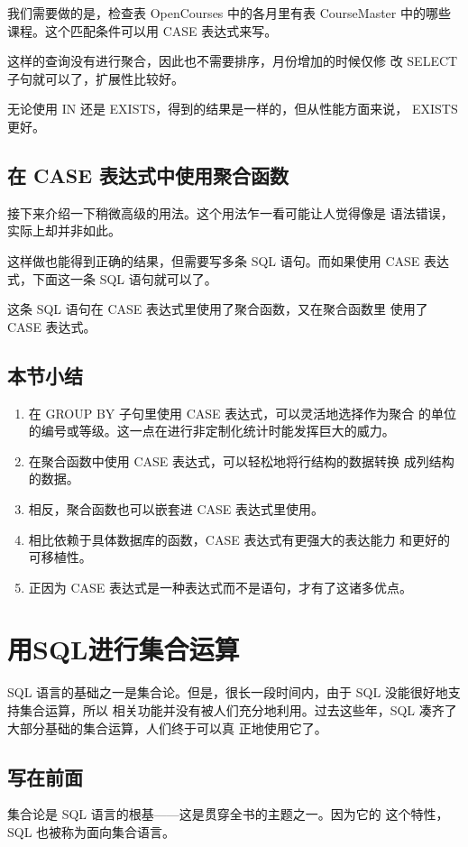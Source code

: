 我们需要做的是，检查表 OpenCourses 中的各月里有表 CourseMaster
中的哪些课程。这个匹配条件可以用 CASE 表达式来写。


这样的查询没有进行聚合，因此也不需要排序，月份增加的时候仅修
改 SELECT 子句就可以了，扩展性比较好。

无论使用 IN 还是 EXISTS，得到的结果是一样的，但从性能方面来说，
EXISTS 更好。

\subsection{在 CASE 表达式中使用聚合函数}
接下来介绍一下稍微高级的用法。这个用法乍一看可能让人觉得像是
语法错误，实际上却并非如此。


这样做也能得到正确的结果，但需要写多条 SQL 语句。而如果使用
CASE 表达式，下面这一条 SQL 语句就可以了。


这条 SQL 语句在 CASE 表达式里使用了聚合函数，又在聚合函数里
使用了 CASE 表达式。

\subsection{本节小结}
\begin{enumerate}
    \item 在 GROUP BY 子句里使用 CASE 表达式，可以灵活地选择作为聚合
          的单位的编号或等级。这一点在进行非定制化统计时能发挥巨大的威力。
    \item 在聚合函数中使用 CASE 表达式，可以轻松地将行结构的数据转换
          成列结构的数据。
    \item 相反，聚合函数也可以嵌套进 CASE 表达式里使用。
    \item 相比依赖于具体数据库的函数，CASE 表达式有更强大的表达能力
          和更好的可移植性。
    \item 正因为 CASE 表达式是一种表达式而不是语句，才有了这诸多优点。
\end{enumerate}

\section{用SQL进行集合运算}
SQL 语言的基础之一是集合论。但是，很长一段时间内，由于 SQL 没能很好地支持集合运算，所以
相关功能并没有被人们充分地利用。过去这些年，SQL 凑齐了大部分基础的集合运算，人们终于可以真
正地使用它了。
\subsection{写在前面}
集合论是 SQL 语言的根基——这是贯穿全书的主题之一。因为它的
这个特性，SQL 也被称为面向集合语言。

